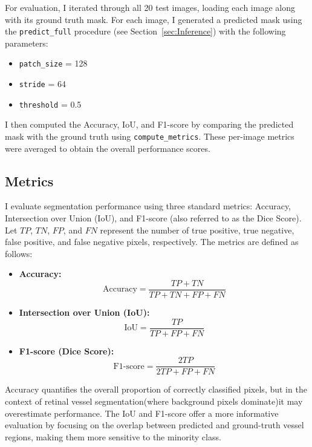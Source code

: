 \documentclass[11pt]{article}
\begin{document}
For evaluation, I iterated through all 20 test images, loading each image along with its ground truth mask. For each image, I generated a predicted mask using the \texttt{predict\_full} procedure (see Section~\ref{sec:Inference}) with the following parameters:
\begin{itemize}
    \item \texttt{patch\_size} = 128
    \item \texttt{stride} = 64
    \item \texttt{threshold} = 0.5
\end{itemize}

I then computed the Accuracy, IoU, and F1-score by comparing the predicted mask with the ground truth using \texttt{compute\_metrics}. These per-image metrics were averaged to obtain the overall performance scores.

\subsection{Metrics}
\label{sec:Metrics}
I evaluate segmentation performance using three standard metrics: Accuracy, Intersection over Union (IoU), and F1-score (also referred to as the Dice Score). Let $TP$, $TN$, $FP$, and $FN$ represent the number of true positive, true negative, false positive, and false negative pixels, respectively. The metrics are defined as follows:

\begin{itemize}
    \item \textbf{Accuracy:}
    \[
    \text{Accuracy} = \frac{TP + TN}{TP + TN + FP + FN}
    \]
    
    \item \textbf{Intersection over Union (IoU):}
    \[
    \text{IoU} = \frac{TP}{TP + FP + FN}
    \]
    
    \item \textbf{F1-score (Dice Score):}
    \[
    \text{F1-score} = \frac{2TP}{2TP + FP + FN}
    \]
\end{itemize}

Accuracy quantifies the overall proportion of correctly classified pixels, but in the context of retinal vessel segmentation(where background pixels dominate)it may overestimate performance. The IoU and F1-score offer a more informative evaluation by focusing on the overlap between predicted and ground-truth vessel regions, making them more sensitive to the minority class.
\end{document}
